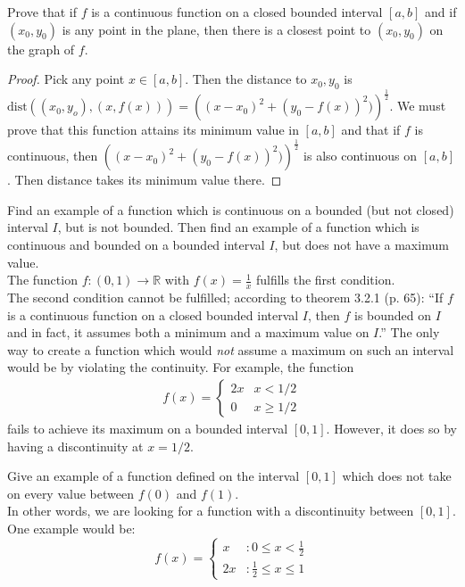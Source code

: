 \documentclass[12pt]{article}
\newcommand{\R}{\mathbb{R}}
\newenvironment{exercise}[2][Exercise]{\begin{trivlist}
\item[\hskip \labelsep {\bfseries #1}\hskip \labelsep {\bfseries #2.}]}{\end{trivlist}}
\begin{document}
\begin{exercise}{3.2.3}
    Prove that if $f$ is a continuous function on a closed bounded interval $[a,b]$ and if $(x_0, y_0)$ is any point in the plane, then there is a closest point to $(x_0,y_0)$ on the graph of $f$. 
    
    \begin{proof}
    Pick any point $x \in [a,b]$. Then the distance to $x_0,y_0$ is $\text{dist}\left( (x_0,y_o), (x,f(x)) \right) = \left( (x-x_0)^2 + (y_0-f(x))^2)\right)^{\frac{1}{2}}$. We must prove that this function attains its minimum value in $[a,b]$ and that if $f$ is continuous, then $\left( (x-x_0)^2 + (y_0-f(x))^2)\right)^{\frac{1}{2}}$ is also continuous on $[a,b]$. Then distance takes its minimum value there.
    \end{proof}
\end{exercise}


\begin{exercise}{3.2.4}
Find an example of a function which is continuous on a bounded (but not closed) interval $I$, but is not bounded. Then find an example of a function which is continuous and bounded on a bounded interval $I$, but does not have a maximum value. \\

The function $f: (0,1) \to \R$ with $f(x)=\frac{1}{x}$ fulfills the first condition. \\
The second condition cannot be fulfilled; according to theorem 3.2.1 (p. 65): ``If $f$ is a continuous function on a closed bounded interval $I$, then $f$ is bounded on $I$ and in fact, it assumes both a minimum and a maximum value on $I$.'' The only way to create a function which would \emph{not} assume a maximum on such an interval would be by violating the continuity. For example, the function	
	\begin{align*}
	f(x) =
		\begin{cases}
		2x & x< 1/2 \\
		0  & x \geq 1/2
		\end{cases}
	\end{align*}
fails to achieve its maximum on a bounded interval $[0,1]$. However, it does so by having a discontinuity at $x = 1/2$.
\end{exercise}



\begin{exercise}{3.2.7}
Give an example of a function defined on the interval $[0,1]$ which does not take on every value between $f(0)$ and $f(1)$. \\

In other words, we are looking for a function with a discontinuity between $[0,1]$. One example would be:
 \begin{displaymath}
   f(x) = \left\{
     \begin{array}{lr}
       x & : 0 \leq x < \frac{1}{2} \\
       2x & : \frac{1}{2} \leq x \leq 1
     \end{array}
   \right.
\end{displaymath} 

\end{exercise}
\end{document}
